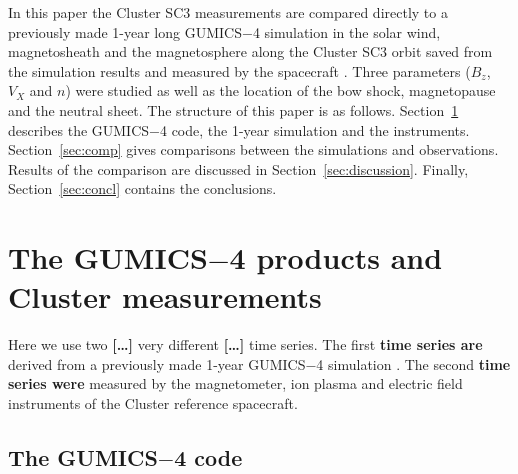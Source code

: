 \documentclass[linenumbers,draft]{agujournal}
\begin{document}
In this paper the Cluster SC3 measurements are compared directly to a previously made 1-year long GUMICS$-$4 simulation in the solar wind, magnetosheath and the magnetosphere along the Cluster SC3 orbit saved from the simulation results and measured by the spacecraft \citep{facsko16:_one_earth}. Three parameters ($B_z$, $V_X$ and $n$) were studied as well as the location of the bow shock, magnetopause and the neutral sheet. The structure of this paper is as follows. Section~\ref{sec:data} describes the GUMICS$-$4 code, the 1-year simulation and the instruments. Section~\ref{sec:comp} gives comparisons between the simulations and observations. Results of the comparison are discussed in Section~\ref{sec:discussion}. Finally, Section~\ref{sec:concl} contains the conclusions.

\section{The GUMICS$-$4 products and Cluster measurements}
\label{sec:data}

Here we use two \textbf{[\dots]} very different \textbf{[\dots]} time series. The first \textbf{time series are} derived from a previously made 1-year GUMICS$-$4 simulation \citep{facsko16:_one_earth}. The second \textbf{time series were} measured by the magnetometer, ion plasma and electric field instruments of the Cluster reference spacecraft.

\subsection{The GUMICS$-$4 code}
\label{sec:gumics}
\end{document}
